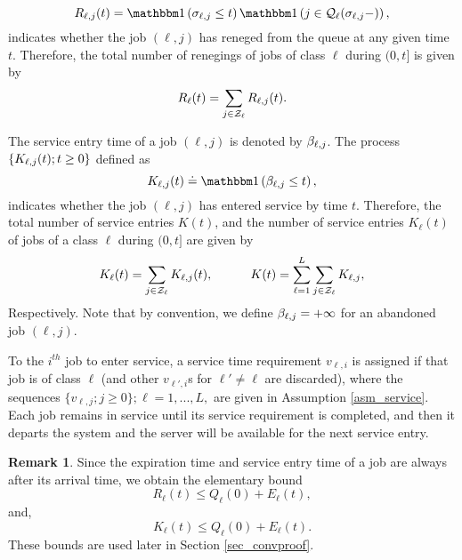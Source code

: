 \documentclass{article}
\theoremstyle{definition}
\newtheorem{remark}[theorem]{Remark}
\numberwithin{equation}{section}
\begin{document}
\begin{equation}\label{def_Rlj}
\reneg_{\ell,j}(t)=\indic{\renegtime_{\ell,j}\leq t}\indic{j\in\inque_\ell(\renegtime_{\ell,j}-)},
\end{equation}
indicates whether the job $(\ell,j)$  has reneged from the queue at any given time $t$. Therefore, the total number of renegings of jobs of class $\ell$  during $(0,t]$ is given by
\begin{equation}
  R_\ell(t) = \sum_{j\in\mathcal{Z}_\ell} R_{\ell,j}(t).
\end{equation}



The service entry time of a job $(\ell,j)$ is denoted by $\beta_{\ell,j}$.  The process $\{K_{\ell,j}(t);t\geq0\}$ defined as
\[
\entry_{\ell,j}(t)\doteq \indic{\entrytime_{\ell,j}\leq t},
\]
indicates whether the job $(\ell,j)$ has entered service by time $t$. Therefore, the total number of service entries $K(t)$, and the number of service entries $K_\ell(t)$ of jobs of a class $\ell$  during $(0,t]$ are given by
\begin{equation}\label{def_Klj}
  K_\ell(t) = \sum_{j\in\mathcal{Z}_\ell} K_{\ell,j}(t),\quad\quad\quad K(t)=\sum_{\ell=1}^{L}\sum_{j\in\mathcal{Z}_\ell}K_{\ell,j},
\end{equation}
Respectively. Note that by convention, we define $\beta_{\ell,j}=+\infty$ for an abandoned job $(\ell,j)$.

To the $i^{th}$ job to enter service, a service time requirement $v_{\ell,i}$ is assigned if that job is of class $\ell$ (and other $v_{\ell',i}$s for $\ell'\neq\ell$ are discarded), where the sequences $\{v_{\ell,j};j\geq0\};\ell=1,...,L,$ are given in Assumption \ref{asm_service}. Each job remains in service until its service requirement is completed, and then it departs the system and the server will be available for the next service entry.





\begin{remark}
  Since the expiration time and service entry time of a job are always after its arrival time, we obtain the elementary bound
  \begin{equation}\label{elementary_bound_R}
	R_\ell(t)  \leq Q_\ell(0)+E_\ell(t),
  \end{equation}
  and,
  \begin{equation}\label{elementary_bound_K}
    K_\ell(t)\leq Q_\ell(0) + E_\ell(t).
  \end{equation}
These bounds are used later in Section \ref{sec_convproof}.
\end{remark}
\end{document}

